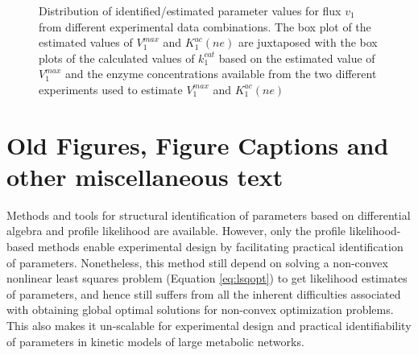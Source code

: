 \documentclass[10pt]{article}
\begin{document}
	\begin{figure}[!tbhp]
		\caption{Distribution of identified/estimated parameter values for flux $v_1$ from different experimental data combinations. The box plot of the estimated values of $V_1^{max}$ and $K_1^{ac}(ne)$ are juxtaposed with the box plots of the calculated values of $k_1^{cat}$ based on the estimated value of $V_1^{max}$ and the enzyme concentrations available from the two different experiments used to estimate $V_1^{max}$ and $K_1^{ac}(ne)$}\label{fig:parameter_value_v1_v1max_kcat}
	\end{figure}	
	
	\clearpage

	\section{Old Figures, Figure Captions and other miscellaneous text}	
	Methods and tools for structural identification of parameters based on differential algebra \parencite{Ljung1994, Audoly2001, Bellu2007} and profile likelihood \parencite{Raue2014} are available. However, only the profile likelihood-based methods enable experimental design by facilitating practical identification of parameters. Nonetheless, this method still depend on solving a non-convex nonlinear least squares problem (Equation \ref{eq:lsqopt}) to get likelihood estimates of parameters, and hence still suffers from all the inherent difficulties associated with obtaining global optimal solutions for non-convex optimization problems. This also makes it un-scalable for experimental design and practical identifiability of parameters in kinetic models of large metabolic networks.	
	
\end{document}
